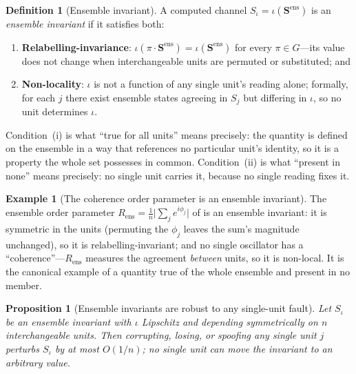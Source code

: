 \documentclass[11pt,a4paper,twocolumn]{article}
\theoremstyle{thmstyle}
\newtheorem{proposition}[theorem]{Proposition}
\theoremstyle{definition}
\newtheorem{definition}[theorem]{Definition}
\newtheorem{example}[theorem]{Example}
\theoremstyle{remark}
\newcommand{\Rens}{R_{\mathrm{ens}}}
\begin{document}
\begin{definition}[Ensemble invariant]
\label{def:ensemble-invariant}
A computed channel $S_\iota=\iota(\mathbf S^{\mathrm{ens}})$ is an
\emph{ensemble invariant} if it satisfies both:
\begin{enumerate}[label=\textup{(\roman*)},leftmargin=2.2em,itemsep=1pt]
\item \textbf{Relabelling-invariance}: $\iota(\pi\cdot\mathbf
S^{\mathrm{ens}})=\iota(\mathbf S^{\mathrm{ens}})$ for every
$\pi\in G$---its value does not change when interchangeable units are
permuted or substituted; and
\item \textbf{Non-locality}: $\iota$ is not a function of any single
unit's reading alone; formally, for each $j$ there exist ensemble states
agreeing in $S_j$ but differing in $\iota$, so no unit determines $\iota$.
\end{enumerate}
\end{definition}

Condition~(i) is what ``true for all units'' means precisely: the quantity
is defined on the ensemble in a way that references no particular unit's
identity, so it is a property the whole set possesses in common.
Condition~(ii) is what ``present in none'' means precisely: no single unit
carries it, because no single reading fixes it.

\begin{example}[The coherence order parameter is an ensemble invariant]
\label{ex:order-invariant}
The ensemble order parameter
$\Rens=\frac1n\bigl|\sum_j e^{i\phi_j}\bigr|$ of  is an
ensemble invariant: it is symmetric in the units (permuting the $\phi_j$
leaves the sum's magnitude unchanged), so it is relabelling-invariant; and
no single oscillator has a ``coherence''---$\Rens$ measures the agreement
\emph{between} units, so it is non-local. It is the canonical example of a
quantity true of the whole ensemble and present in no member.
\end{example}

\begin{proposition}[Ensemble invariants are robust to any single-unit fault]
\label{prop:invariant-robust}
Let $S_\iota$ be an ensemble invariant with $\iota$ Lipschitz and
depending symmetrically on $n$ interchangeable units. Then corrupting,
losing, or spoofing any single unit $j$ perturbs $S_\iota$ by at most
$O(1/n)$; no single unit can move the invariant to an arbitrary value.
\end{proposition}
\end{document}

